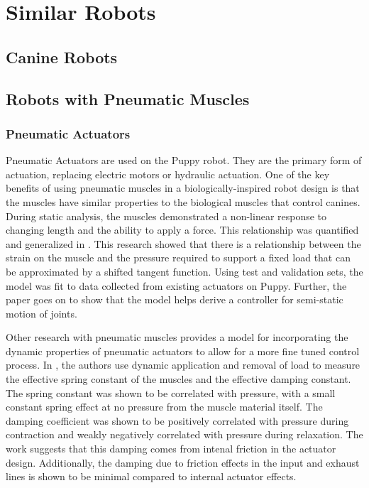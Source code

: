 \section{Similar Robots}

\subsection{Canine Robots}

\subsection{Robots with Pneumatic Muscles}



\subsubsection{Pneumatic Actuators}

Pneumatic Actuators are used on the Puppy robot. They are the primary form of actuation, replacing electric motors or hydraulic actuation. One of the key benefits of using pneumatic muscles in a biologically-inspired robot design is that the muscles have similar properties to the biological muscles that control canines. 
During static analysis, the muscles demonstrated a non-linear response to changing length and the ability to apply a force. This relationship was quantified and generalized in \cite{HuntPMuscles}. This research showed that there is a relationship between the strain on the muscle and the pressure required to support a fixed load that can be approximated by a shifted tangent function. Using test and validation sets, the model was fit to data collected from existing actuators on Puppy. Further, the paper goes on to show that the model helps derive a controller for semi-static motion of joints. \cite{HuntPMuscles}

Other research with pneumatic muscles provides a model for incorporating the dynamic properties of pneumatic actuators to allow for a more fine tuned control process. In \cite{DynamicPMuscles}, the authors use dynamic application and removal of load to measure the effective spring constant of the muscles and the effective damping constant. The spring constant was shown to be correlated with pressure, with a small constant spring effect at no pressure from the muscle material itself. The damping coefficient was shown to be positively correlated with pressure during contraction and weakly negatively correlated with pressure during relaxation. The work suggests that this damping comes from intenal friction in the actuator design. Additionally, the damping due to friction effects in the input and exhaust lines is shown to be minimal compared to internal actuator effects. \cite{DynamicPMuscles}


